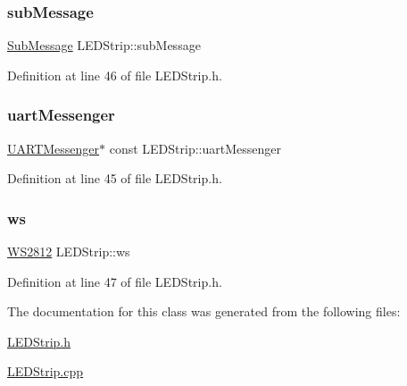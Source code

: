 \mbox{\label{class_l_e_d_strip_a25cf156735c1629b92b8dfe7a54e9b41}} 
\subsubsection{\texorpdfstring{sub\+Message}{subMessage}}
{\footnotesize\ttfamily \hyperlink{struct_sub_message}{Sub\+Message} L\+E\+D\+Strip\+::sub\+Message\hspace{0.3cm}{\ttfamily [private]}}



Definition at line 46 of file L\+E\+D\+Strip.\+h.

\mbox{\label{class_l_e_d_strip_a4387042fe2a80bcd5dc3e9d7524800ae}} 
\subsubsection{\texorpdfstring{uart\+Messenger}{uartMessenger}}
{\footnotesize\ttfamily \hyperlink{class_u_a_r_t_messenger}{U\+A\+R\+T\+Messenger}$\ast$ const L\+E\+D\+Strip\+::uart\+Messenger\hspace{0.3cm}{\ttfamily [private]}}



Definition at line 45 of file L\+E\+D\+Strip.\+h.

\mbox{\label{class_l_e_d_strip_a81c4bffd481d09defe63642c9e69ed17}} 
\subsubsection{\texorpdfstring{ws}{ws}}
{\footnotesize\ttfamily \hyperlink{class_w_s2812}{W\+S2812} L\+E\+D\+Strip\+::ws\hspace{0.3cm}{\ttfamily [private]}}



Definition at line 47 of file L\+E\+D\+Strip.\+h.



The documentation for this class was generated from the following files\+:\begin{DoxyCompactItemize}
\item 
\hyperlink{_l_e_d_strip_8h}{L\+E\+D\+Strip.\+h}\item 
\hyperlink{_l_e_d_strip_8cpp}{L\+E\+D\+Strip.\+cpp}\end{DoxyCompactItemize}
